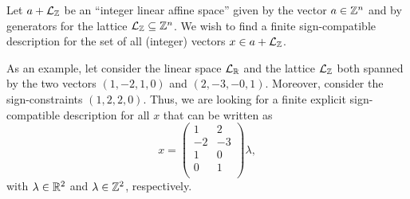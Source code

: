 
Let $a+\mathcal{L}_{\mathbb Z}$ be an ``integer linear affine space'' given by
the vector $a\in\mathbb Z^n$ and by generators for the lattice
$\mathcal{L}_{\mathbb Z}\subseteq\mathbb Z^n$. We wish to find a finite
sign-compatible description for the set of all (integer) vectors
$x\in a+\mathcal{L}_{\mathbb Z}$.



As an example, let consider the linear space $\mathcal{L}_{\mathbb R}$ and the
lattice $\mathcal{L}_{\mathbb Z}$ both spanned by the two vectors $(1,-2,1,0)$
and $(2,-3,-0,1)$. Moreover, consider the sign-constraints
$(1,2,2,0)$. Thus, we are looking for a finite explicit
sign-compatible description for all $x$ that can be written as
\[
x=\left(
\begin{array}{rr}
1 & 2\\
-2 & -3\\
1 & 0\\
0 & 1\\
\end{array}
\right)\lambda,
\]
with $\lambda\in\mathbb R^2$ and $\lambda\in\mathbb Z^2$, respectively.

